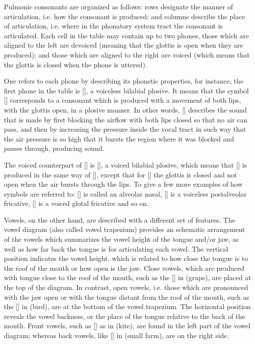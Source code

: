 Pulmonic consonants are organized as follows: rows designate the manner of articulation, i.e. how the consonant is produced; and columns describe the place of articulation, i.e. where in the phonatory system tract the consonant is articulated. Each cell in the table may contain up to two phones, those which are aligned to the left are devoiced (meaning that the glottis is open when they are produced); and those which are aligned to the right are voiced (which means that the glottis is closed when the phone is uttered). 

One refers to each phone by describing its phonetic properties, for instance, the first phone in the table is [], a voiceless bilabial plosive. It means that the symbol [] corresponds to a consonant which is produced with a movement of both lips, with the glottis open, in a plosive manner. In other words, [] describes the sound that is made by first blocking the airflow with both lips closed so that no air can pass, and then by increasing the pressure inside the vocal tract in such way that the air pressure is so high that it bursts the region where it was blocked and passes through, producing sound.

The voiced counterpart of [] is [], a voiced bilabial plosive, which means that [] is produced in the same way of [], except that for [] the glottis is closed and not open when the air bursts through the lips. To give a few more examples of how symbols are referred to: [] is called an alveolar nasal, [] is a voiceless postalveolar fricative, [] is a voiced glotal fricative and so on.

Vowels, on the other hand, are described with a different set of features. The vowel diagram (also called vowel trapezium) provides an schematic arrangement of the vowels which summarizes the vowel height of the tongue and/or jaw, as well as how far back the tongue is for articulating each vowel. The vertical position indicates the vowel height, which is related to how close the tongue is to the roof of the mouth or how open is the jaw. Close vowels, which are produced with tongue close to the roof of the mouth, such as the [] in  (grape), are placed at the top of the diagram. In contrast, open vowels, i.e. those which are pronounced with the jaw open or with the tongue distant from the roof of the mouth, such as the [] in  (bird), are at the bottom of the vowel trapezium. The horizontal position reveals the vowel backness, or the place of the tongue relative to the back of the mouth. Front vowels, such as [] as in  (kite), are found in the left part of the vowel diagram; whereas back vowels, like [] in  (small farm), are on the right side.

